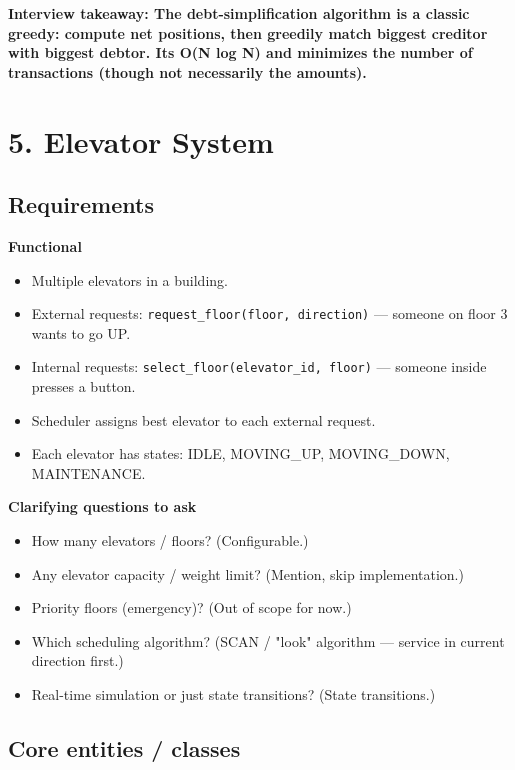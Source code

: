 \documentclass[11pt]{article}
\providecommand{\tightlist}{\setlength{\itemsep}{1pt}\setlength{\parskip}{0pt}}
\begin{document}
\textbf{Interview takeaway: The debt-simplification algorithm is a classic greedy: compute net positions, then greedily match biggest creditor with biggest debtor. It\textquotesingle s O(N log N) and minimizes the number of transactions (though not necessarily the amounts).}

\section{5. Elevator System}\label{5-elevator-system}

\subsection{Requirements}\label{requirements-4}

\textbf{Functional}

\begin{itemize}
\tightlist
\item
  Multiple elevators in a building.
\item
  External requests: \texttt{request\_floor(floor,\ direction)} --- someone on floor 3 wants to go UP.
\item
  Internal requests: \texttt{select\_floor(elevator\_id,\ floor)} --- someone inside presses a button.
\item
  Scheduler assigns best elevator to each external request.
\item
  Each elevator has states: IDLE, MOVING\_UP, MOVING\_DOWN, MAINTENANCE.
\end{itemize}

\textbf{Clarifying questions to ask}

\begin{itemize}
\tightlist
\item
  How many elevators / floors? (Configurable.)
\item
  Any elevator capacity / weight limit? (Mention, skip implementation.)
\item
  Priority floors (emergency)? (Out of scope for now.)
\item
  Which scheduling algorithm? (SCAN / "look" algorithm --- service in current direction first.)
\item
  Real-time simulation or just state transitions? (State transitions.)
\end{itemize}

\subsection{Core entities / classes}\label{core-entities--classes-4}
\end{document}
